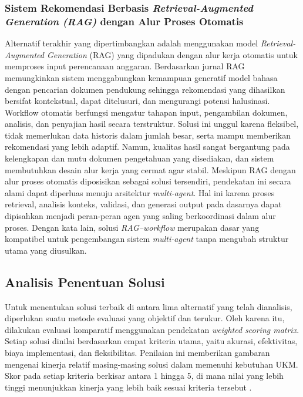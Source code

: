 \subsubsection{Sistem Rekomendasi Berbasis \textit{Retrieval-Augmented Generation (RAG)} dengan Alur Proses Otomatis}
Alternatif terakhir yang dipertimbangkan adalah menggunakan model \textit{Retrieval-Augmented Generation} (RAG) yang dipadukan dengan alur kerja otomatis untuk memproses input perencanaan anggaran. Berdasarkan jurnal \textcite{lewis2020} RAG memungkinkan sistem menggabungkan kemampuan generatif model bahasa dengan pencarian dokumen pendukung sehingga rekomendasi yang dihasilkan bersifat kontekstual, dapat ditelusuri, dan mengurangi potensi halusinasi. Workflow otomatis berfungsi mengatur tahapan input, pengambilan dokumen, analisis, dan penyajian hasil secara terstruktur. Solusi ini unggul karena fleksibel, tidak memerlukan data historis dalam jumlah besar, serta mampu memberikan rekomendasi yang lebih adaptif. Namun, kualitas hasil sangat bergantung pada kelengkapan dan mutu dokumen pengetahuan yang disediakan, dan sistem membutuhkan desain alur kerja yang cermat agar stabil.
Meskipun RAG dengan alur proses otomatis diposisikan sebagai solusi tersendiri, pendekatan ini secara alami dapat diperluas menuju arsitektur \textit{multi-agent}. Hal ini karena proses retrieval, analisis konteks, validasi, dan generasi output pada dasarnya dapat dipisahkan menjadi peran-peran agen yang saling berkoordinasi dalam alur proses. Dengan kata lain, solusi \textit{RAG–workflow} merupakan dasar yang kompatibel untuk pengembangan sistem \textit{multi-agent} tanpa mengubah struktur utama yang diusulkan.

\subsection{Analisis Penentuan Solusi}
Untuk menentukan solusi terbaik di antara lima alternatif yang telah dianalisis, diperlukan suatu metode evaluasi yang objektif dan terukur. Oleh karena itu, dilakukan evaluasi komparatif menggunakan pendekatan \textit{weighted scoring matrix}. Setiap solusi dinilai berdasarkan empat kriteria utama, yaitu akurasi, efektivitas, biaya implementasi, dan fleksibilitas. Penilaian ini memberikan gambaran mengenai kinerja relatif masing-masing solusi dalam memenuhi kebutuhan UKM. Skor pada setiap kriteria berkisar antara 1 hingga 5, di mana nilai yang lebih tinggi menunjukkan kinerja yang lebih baik sesuai kriteria tersebut \autocite{Faisal2025}.

